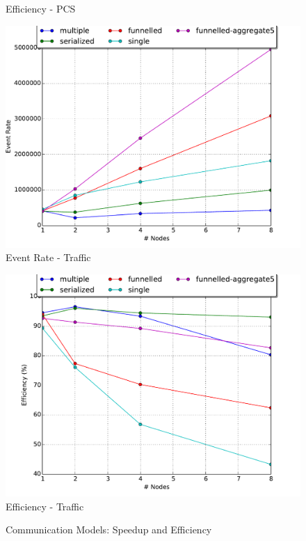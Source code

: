 \documentclass[11pt]{book}
\begin{document}
\begin{figure}
\begin{minipage}{.5\textwidth}
\begin{center}
      Efficiency - PCS \\
    \end{center}
  \end{minipage}
  \begin{minipage}{.5\textwidth}
    \begin{center}
      \includegraphics[width=\textwidth,keepaspectratio,quiet]{figs/partitioning_communication/communication_traffic_eventrate.pdf} \\
      Event Rate - Traffic \\
    \end{center}
  \end{minipage}%
  \hfill
  \begin{minipage}{.5\textwidth}
    \begin{center}
      \includegraphics[width=\textwidth,keepaspectratio,quiet]{figs/partitioning_communication/communication_traffic_efficiency.pdf} \\
      Efficiency - Traffic \\
    \end{center}
  \end{minipage}
  \caption{Communication Models: Speedup and Efficiency}\label{model_communication}
\end{figure}
\end{document}
